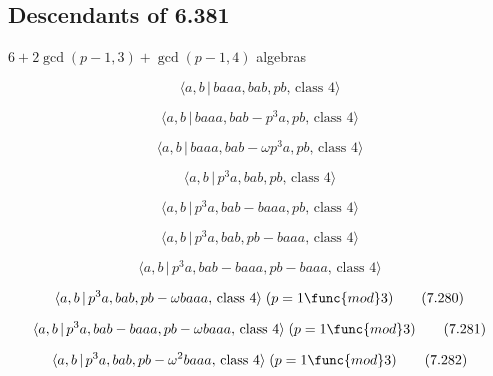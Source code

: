 \documentclass[10pt]{article}
\begin{document}
\subsection{Descendants of 6.381}

$6+2\gcd (p-1,3)+\gcd (p-1,4)$ algebras

\begin{equation}
\langle a,b\,|\,baaa,bab,pb,\,\text{class }4\rangle  \tag{7.273}
\end{equation}

\begin{equation}
\langle a,b\,|\,baaa,bab-p^3a,pb,\,\text{class }4\rangle  \tag{7.274}
\end{equation}

\begin{equation}
\langle a,b\,|\,baaa,bab-\omega p^{3}a,pb,\,\text{class }4\rangle 
\tag{7.275}
\end{equation}

\begin{equation}
\langle a,b\,|\,p^3a,bab,pb,\,\text{class }4\rangle  \tag{7.276}
\end{equation}

\begin{equation}
\langle a,b\,|\,p^3a,bab-baaa,pb,\,\text{class }4\rangle  \tag{7.277}
\end{equation}

\begin{equation}
\langle a,b\,|\,p^3a,bab,pb-baaa,\,\text{class }4\rangle  \tag{7.278}
\end{equation}

\begin{equation}
\langle a,b\,|\,p^3a,bab-baaa,pb-baaa,\,\text{class }4\rangle  \tag{7.279}
\end{equation}

\begin{equation}
\langle a,b\,|\,p^{3}a,bab,pb-\omega baaa,\,\text{class }4\rangle \;(p=1%
\func{mod}3)  \tag{7.280}
\end{equation}

\begin{equation}
\langle a,b\,|\,p^{3}a,bab-baaa,pb-\omega baaa,\,\text{class }4\rangle \;(p=1%
\func{mod}3)  \tag{7.281}
\end{equation}

\begin{equation}
\langle a,b\,|\,p^{3}a,bab,pb-\omega ^{2}baaa,\,\text{class }4\rangle \;(p=1%
\func{mod}3)  \tag{7.282}
\end{equation}
\end{document}
